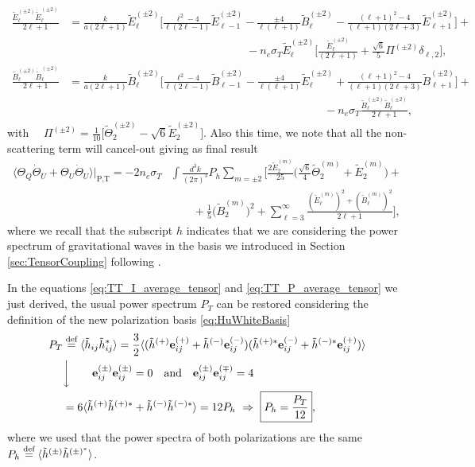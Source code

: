 \begin{align*}
    \frac{\tilde E_\ell^{(\pm2)}\dot{\tilde E}_\ell^{(\pm2)}}{2\ell+1}&=\frac{k}{a(2\ell+1)}\tilde E_\ell^{(\pm2)}\bigg[\frac{\ell^2-4}{\ell(2\ell-1)}\tilde E_{\ell-1}^{(\pm2)}-\frac{\pm4}{\ell(\ell+1)}\tilde B_\ell^{(\pm2)}-\frac{(\ell+1)^2-4}{(\ell+1)(2\ell+3)}\tilde E_{\ell+1}^{(\pm2)}\bigg]+\nonumber\\&\qquad\qquad\quad\qquad\qquad\qquad\qquad\qquad\quad-n_e\sigma_T\tilde E_\ell^{(\pm2)}\bigg[\frac{\tilde E_{\ell}^{(\pm2)}}{(2\ell+1)}+\frac{\sqrt{6}}{5}\Pi^{(\pm2)}\delta_{\ell,2}\bigg],\\
    \frac{\tilde B_\ell^{(\pm2)}\dot{\tilde B}_\ell^{(\pm2)}}{2\ell+1}&=\frac{k}{a(2\ell+1)}\tilde B_\ell^{(\pm2)}\bigg[\frac{\ell^2-4}{\ell(2\ell-1)}\tilde B_{\ell-1}^{(\pm2)}-\frac{\pm4}{\ell(\ell+1)}\tilde E_\ell^{(\pm2)}+\frac{(\ell+1)^2-4}{(\ell+1)(2\ell+3)}\tilde B_{\ell+1}^{(\pm2)}\bigg]+\nonumber\\&\qquad\qquad\qquad\qquad\qquad\qquad\qquad\qquad\qquad\qquad\qquad\quad-n_e\sigma_T\frac{\tilde B_\ell^{(\pm2)}\tilde B_{\ell}^{(\pm2)}}{2\ell+1},
\end{align*}
with $\quad\Pi^{(\pm2)}=\frac{1}{10}\big[\tilde\Theta_2^{(\pm2)}-\sqrt{6}\tilde E_2^{(\pm2)}\big]$. Also this time, we note that all the non-scattering term will cancel-out giving as final result
\begin{align}
    \langle\Theta_Q\dot\Theta_U+\Theta_U\dot\Theta_U\rangle\bigg|_\text{P,T}=-2n_e\sigma_T&\int\frac{d^3k}{(2\pi)^3}{P}_h\sum_{m=\pm2}\bigg[\frac{2\tilde E_2^{(m)}}{25}\bigg(\frac{\sqrt{6}}{4}\tilde\Theta_2^{(m)}+\tilde E_2^{(m)}\bigg)+\nonumber\\&\qquad+\frac{1}{5}\bigg(\tilde B_2^{(m)}\bigg)^2+\sum_{\ell=3}^{\infty}\frac{(\tilde E_\ell^{(m)})^2+(\tilde B_\ell^{(m)})^2}{2\ell+1}\bigg],\label{eq:TT_P_average_tensor}
\end{align}
where we recall that the subscript $h$ indicates that we are considering the power spectrum of gravitational waves in the basis we introduced in Section \ref{sec:TensorCoupling} following \cite{HuWhite}.  

In the equations \eqref{eq:TT_I_average_tensor} and \eqref{eq:TT_P_average_tensor} we just derived, the usual power spectrum ${P}_T$ can be restored considering the definition of the new polarization basis \eqref{eq:HuWhiteBasis}
\begin{align*}
    {P}_T&\stackrel{\text{def}}{=}\langle \tilde h_{ij}\tilde h^*_{ij}\rangle=\frac{3}{2}\langle (\tilde h^{(+)}\mathbf e_{ij}^{(+)}+\tilde h^{(-)}\mathbf e_{ij}^{(-)})(\tilde h^{(+)*}\mathbf e_{ij}^{(-)}+\tilde h^{(-)*}\mathbf e_{ij}^{(+)})\rangle\\
    &\bigg \downarrow\qquad \mathbf{e}_{ij}^{(\pm)}\mathbf{e}_{ij}^{(\pm)}=0\quad \text{and}\quad \mathbf{e}_{ij}^{(\pm)}\mathbf{e}_{ij}^{(\mp)}=4 
    \\
    &=6\langle\tilde h^{(+)}\tilde h^{(+)*}+\tilde h^{(-)}\tilde h^{(-)*}\rangle=12{P}_h\ \Rightarrow\ \boxed{{P}_h=\frac{{P}_T}{12}},
\end{align*}
where we used that the power spectra of both polarizations are the same ${P}_h\stackrel{\text{def}}{=}\langle\tilde h^{(\pm)}\tilde h^{(\pm)^*}\rangle$. 
